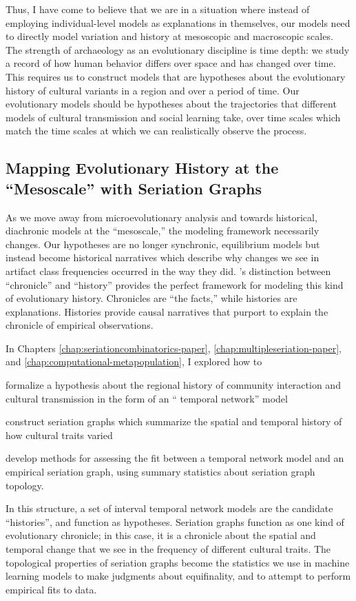 Thus, I have come to believe that we are in a situation where instead of employing individual-level models as explanations in themselves, our models need to directly model variation and history at mesoscopic and macroscopic scales.  
The strength of archaeology as an evolutionary discipline is time depth:  we study a record of how human behavior differs over space and has changed over time.  This requires us to construct models that are hypotheses about the evolutionary history of cultural variants in a region and over a period of time.  Our evolutionary models should be hypotheses about the trajectories that different models of cultural transmission and social learning take, over time scales which match the time scales at which we can realistically observe the process.  


\subsection{Mapping Evolutionary History at the ``Mesoscale'' with Seriation Graphs}\label{conc:sec:conc-seriation}

As we move away from microevolutionary analysis and towards historical, diachronic models at the ``mesoscale,'' the modeling framework necessarily changes.  Our hypotheses are no longer synchronic, equilibrium models but instead become historical narratives which describe why changes we see in artifact class frequencies occurred in the way they did.  \citet{OHara1988}'s distinction between ``chronicle'' and ``history'' provides the perfect framework for modeling this kind of evolutionary history.  Chronicles are ``the facts,'' while histories are explanations.  Histories provide causal narratives that purport to explain the chronicle of empirical observations. 

In Chapters \ref{chap:seriationcombinatorics-paper}, \ref{chap:multipleseriation-paper}, and \ref{chap:computational-metapopulation}, I explored how to \begin{dissparalist}
\item formalize a hypothesis about the regional history of community interaction and cultural transmission in the form of an `` temporal network'' model
\item construct seriation graphs which summarize the spatial and temporal history of how cultural traits varied 
\item develop methods for assessing the fit between a temporal network model and an empirical seriation graph, using summary statistics about seriation graph topology.
\end{dissparalist}  In this structure, a set of interval temporal network models are the candidate ``histories'', and function as hypotheses.  Seriation graphs function as one kind of evolutionary chronicle; in this case, it is a chronicle about the spatial and temporal change that we see in the frequency of different cultural traits.  The topological properties of seriation graphs become the statistics we use in machine learning models to make judgments about equifinality, and to attempt to perform empirical fits  to data. 

